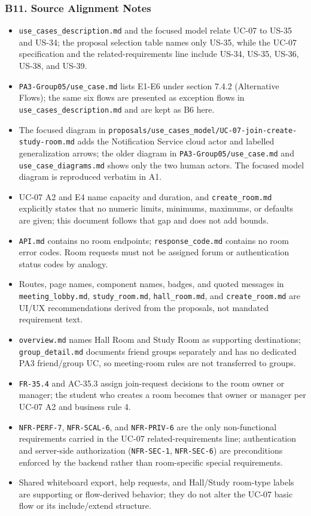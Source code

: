 \documentclass[12pt]{article}
\begin{document}
\hypertarget{sec:b11-source-alignment-notes}{}
\subsubsection*{B11. Source Alignment Notes}
\par\medskip

\begin{itemize}
\item \texttt{use\_cases\_description.md} and the focused model relate UC-07 to US-35 and US-34; the proposal selection table names only US-35, while the UC-07 specification and the related-requirements line include US-34, US-35, US-36, US-38, and US-39.
\item \texttt{PA3-Group05/use\_case.md} lists E1-E6 under section 7.4.2 (Alternative Flows); the same six flows are presented as exception flows in \texttt{use\_cases\_description.md} and are kept as B6 here.
\item The focused diagram in \texttt{proposals/use\_cases\_model/UC-07-join-create-study-room.md} adds the Notification Service cloud actor and labelled generalization arrows; the older diagram in \texttt{PA3-Group05/use\_case.md} and \texttt{use\_case\_diagrams.md} shows only the two human actors. The focused model diagram is reproduced verbatim in A1.
\item UC-07 A2 and E4 name capacity and duration, and \texttt{create\_room.md} explicitly states that no numeric limits, minimums, maximums, or defaults are given; this document follows that gap and does not add bounds.
\item \texttt{API.md} contains no room endpoints; \texttt{response\_code.md} contains no room error codes. Room requests must not be assigned forum or authentication status codes by analogy.
\item Routes, page names, component names, badges, and quoted messages in \texttt{meeting\_lobby.md}, \texttt{study\_room.md}, \texttt{hall\_room.md}, and \texttt{create\_room.md} are UI/UX recommendations derived from the proposals, not mandated requirement text.
\item \texttt{overview.md} names Hall Room and Study Room as supporting destinations; \texttt{group\_detail.md} documents friend groups separately and has no dedicated PA3 friend/group UC, so meeting-room rules are not transferred to groups.
\item \texttt{FR-35.4} and AC-35.3 assign join-request decisions to the room owner or manager; the student who creates a room becomes that owner or manager per UC-07 A2 and business rule 4.
\item \texttt{NFR-PERF-7}, \texttt{NFR-SCAL-6}, and \texttt{NFR-PRIV-6} are the only non-functional requirements carried in the UC-07 related-requirements line; authentication and server-side authorization (\texttt{NFR-SEC-1}, \texttt{NFR-SEC-6}) are preconditions enforced by the backend rather than room-specific special requirements.
\item Shared whiteboard export, help requests, and Hall/Study room-type labels are supporting or flow-derived behavior; they do not alter the UC-07 basic flow or its include/extend structure.
\end{itemize}
\end{document}
